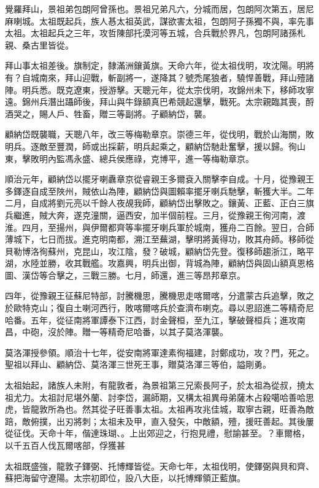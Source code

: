 \begin{pinyinscope}
覺羅拜山，景祖弟包朗阿曾孫也。景祖兄弟凡六，分城而居，包朗阿次第五，居尼麻喇城。太祖既起兵，族人惎太祖英武，謀欲害太祖，包朗阿子孫獨不與，率先事太祖。太祖起兵之三年，攻哲陳部托漠河等五城，合兵戰於界凡，包朗阿諸孫札親、桑古里皆從。

拜山事太祖差後。旗制定，隸滿洲鑲黃旗。天命六年，從太祖伐明，攻沈陽。明將有？自城南來，拜山迎戰，斬副將一，遂降其？號禿尾狼者，驍悍善戰，拜山殪諸陣。明兵悉。既克遼東，授游擊。天聰元年，從太宗伐明，攻錦州未下，移師攻寧遠。錦州兵潛出躡師後，拜山與牛錄額真巴希競起還擊，戰死。太宗親臨其喪，酹酒哭之，賜人戶、牲畜，贈三等副將。子顧納岱，襲。

顧納岱既襲職，天聰八年，改三等梅勒章京。崇德三年，從伐明，戰於山海關，敗明兵。逐敵至豐潤，師或出採薪，明兵起乘之，顧納岱馳赴奮擊，援以歸。徇山東，擊敗明內監馮永盛、總兵侯應祿，克博平，進一等梅勒章京。

順治元年，顧納岱以擺牙喇纛章京從睿親王多爾袞入關擊李自成。十月，從豫親王多鐸逐自成至陜州，賊依山為陣，顧納岱與圖賴率擺牙喇兵馳擊，斬獲大半。二年二月，自成將劉元亮以千餘人夜覘我師，顧納岱出擊敗之。鑲黃、正藍、正白三旗兵繼進，賊大奔，遂克潼關，逼西安，加半個前程。三月，從豫親王徇河南，渡淮。四月，至揚州，與伊爾都齊等率擺牙喇兵軍於城南，獲舟二百餘。翌日，合師薄城下，七日而拔。進克明南都，溯江至蕪湖，擊明將黃得功，敗其舟師。移師從貝勒博洛徇蘇州，克昆山，攻江陰，發？破城，顧納岱先登。復移師趨浙江，略平湖，水陸並勝，收其戰艦。攻嘉興，明兵出御，背城為陣，顧納岱與固山額真恩格圖、漢岱等合擊之，三戰三勝。七月，師還，進三等昂邦章京。

四年，從豫親王征蘇尼特部，討騰機思，騰機思走喀爾喀，分遣蒙古兵追擊，敗之於歐特克山；復自土喇河西行，敗喀爾喀兵於查濟布喇克。尋以恩詔進二等精奇尼哈番。五年，從征南將軍譚泰下江西，討金聲桓，至九江，擊破聲桓兵；進攻南昌，中砲，沒於陣。贈一等精奇尼哈番，以其子莫洛渾襲。

莫洛渾授參領。順治十七年，從安南將軍達素徇福建，討鄭成功，攻？門，死之。聖祖以拜山、顧納岱、莫洛渾三世死王事，贈莫洛渾三等伯，謚剛勇。

太祖始起，諸族人未附，有龍敦者，為景祖第三兄索長阿子，於太祖為從叔，撓太祖尤力。太祖討尼堪外蘭、討李岱，漏師期，又構太祖異母弟薩木占殺噶哈善哈思虎，皆龍敦所為也。然其從子旺善事太祖。太祖再攻兆佳城，取寧古親，旺善為敵踣，敵俯撲，出刃將刺；太祖未及甲，直入發矢，中敵額，殪，援旺善起。其後屢從征伐。天命十年，偕達珠瑚、。上出郊迎之，行抱見禮，慰諭甚至。？車爾格，以千五百人伐瓦爾喀部，俘獲甚

太祖既盛強，龍敦子鐸弼、托博輝皆從。天命七年，太祖伐明，使鐸弼與貝和齊、蘇把海留守遼陽。太宗初即位，設八大臣，以托博輝領正藍旗。


\end{pinyinscope}
